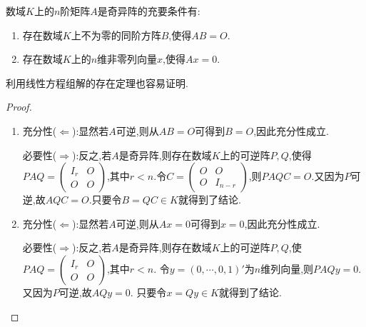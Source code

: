 \documentclass[../../main.tex]{subfiles}%
\begin{document}
\begin{proposition}[奇异阵的充要条件]\label{proposition:奇异阵的充要条件}
数域$K$上的$n$阶矩阵$A$是奇异阵的充要条件有:
\begin{enumerate}
\item\label{proposition:奇异阵的充要条件1} 存在数域$K$上不为零的同阶方阵$B$,使得$AB=O$.
\item\label{proposition:奇异阵的充要条件2} 存在数域$K$上的$n$维非零列向量$x$,使得$Ax=0$.
\end{enumerate}
\end{proposition}
\begin{remark}
利用线性方程组解的存在定理也容易证明.
\end{remark}
\begin{proof}
\begin{enumerate}
\item 充分性($\Leftarrow$):显然若\(A\)可逆,则从\(AB = O\)可得到\(B = O\),因此充分性成立.

必要性($\Rightarrow$):反之,若\(A\)是奇异阵,则存在数域$K$上的可逆阵\(P,Q\),使得\(PAQ = \begin{pmatrix}I_r & O \\ O & O\end{pmatrix}\),其中\(r < n\).令\(C = \begin{pmatrix}O & O \\ O & I_{n - r}\end{pmatrix}\),则\(PAQC = O\).又因为\(P\)可逆,故\(AQC = O\).只要令\(B = QC\in K\)就得到了结论.

\item 充分性($\Leftarrow$):显然若\(A\)可逆,则从\(Ax = 0\)可得到\(x = 0\),因此充分性成立.

必要性($\Rightarrow$):反之,若\(A\)是奇异阵,则存在数域$K$上的可逆阵\(P,Q\),使\(PAQ = \begin{pmatrix}I_r & O \\ O & O\end{pmatrix}\),其中\(r < n\).
令\(y = (0,\cdots,0,1)'\)为\(n\)维列向量,则\(PAQy = 0\).又因为\(P\)可逆,故\(AQy = 0\).
只要令\(x = Qy\in K\)就得到了结论.
\end{enumerate}

\end{proof}
\end{document}

